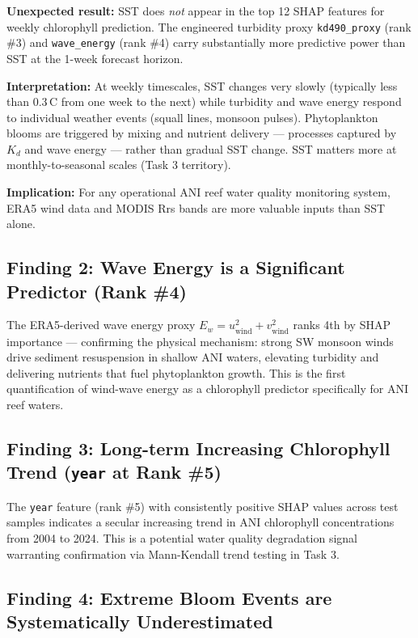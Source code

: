 \documentclass[12pt,a4paper]{report}
\begin{document}
\begin{findingbox}
\textbf{Unexpected result:} SST does \textit{not} appear in the top 12 SHAP features for
weekly chlorophyll prediction. The engineered turbidity proxy \texttt{kd490\_proxy}
(rank \#3) and \texttt{wave\_energy} (rank \#4) carry substantially more predictive
power than SST at the 1-week forecast horizon.

\textbf{Interpretation:} At weekly timescales, SST changes very slowly (typically less than 0.3\,\textdegree C
from one week to the next)
while turbidity and wave energy respond to individual weather events (squall lines,
monsoon pulses). Phytoplankton blooms are triggered by mixing and nutrient delivery —
processes captured by $K_d$ and wave energy — rather than gradual SST change. SST matters
more at monthly-to-seasonal scales (Task 3 territory).

\textbf{Implication:} For any operational ANI reef water quality monitoring system,
ERA5 wind data and MODIS Rrs bands are more valuable inputs than SST alone.
\end{findingbox}

\subsection*{Finding 2: Wave Energy is a Significant Predictor (Rank \#4)}

The ERA5-derived wave energy proxy $E_w = u_{\text{wind}}^2 + v_{\text{wind}}^2$
ranks 4th by SHAP importance — confirming the physical mechanism: strong SW monsoon
winds drive sediment resuspension in shallow ANI waters, elevating turbidity and
delivering nutrients that fuel phytoplankton growth. This is the first quantification
of wind-wave energy as a chlorophyll predictor specifically for ANI reef waters.

\subsection*{Finding 3: Long-term Increasing Chlorophyll Trend (\texttt{year} at Rank \#5)}

The \texttt{year} feature (rank \#5) with consistently positive SHAP values across test
samples indicates a secular increasing trend in ANI chlorophyll concentrations from 2004
to 2024. This is a potential water quality degradation signal warranting confirmation via
Mann-Kendall trend testing in Task 3.

\subsection*{Finding 4: Extreme Bloom Events are Systematically Underestimated}
\end{document}
